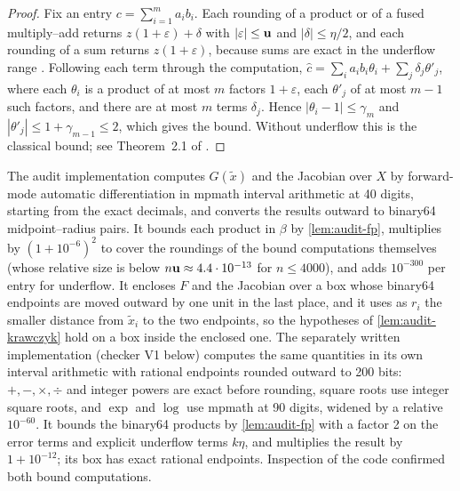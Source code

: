 \begin{proof}
Fix an entry $c=\sum_{i=1}^m a_ib_i$.
Each rounding of a product or of a fused multiply–add returns $z(1+\varepsilon)+\delta$ with $|\varepsilon|\le\mathbf{u}$ and $|\delta|\le\eta/2$, and each rounding of a sum returns $z(1+\varepsilon)$, because sums are exact in the underflow range \citep[Section~2]{rump2010-verification-methods-rigorous-results-using}.
Following each term through the computation, $\hat c=\sum_i a_ib_i\theta_i+\sum_j\delta_j\theta'_j$, where each $\theta_i$ is a product of at most $m$ factors $1+\varepsilon$, each $\theta'_j$ of at most $m-1$ such factors, and there are at most $m$ terms $\delta_j$.
Hence $|\theta_i-1|\le\gamma_m$ and $|\theta'_j|\le1+\gamma_{m-1}\le2$, which gives the bound.
Without underflow this is the classical bound; see Theorem~2.1 of \citet{rump2010-verification-methods-rigorous-results-using}.
\end{proof}

The audit implementation computes $G(\tilde x)$ and the Jacobian over $X$ by forward-mode automatic differentiation in mpmath interval arithmetic at 40 digits, starting from the exact decimals, and converts the results outward to binary64 midpoint–radius pairs.
It bounds each product in $\beta$ by \cref{lem:audit-fp}, multiplies by $(1+10^{-6})^2$ to cover the roundings of the bound computations themselves (whose relative size is below $n\mathbf{u}\approx4.4\cdot10^{-13}$ for $n\le4000$), and adds $10^{-300}$ per entry for underflow.
It encloses $F$ and the Jacobian over a box whose binary64 endpoints are moved outward by one unit in the last place, and it uses as $r_i$ the smaller distance from $\tilde x_i$ to the two endpoints, so the hypotheses of \cref{lem:audit-krawczyk} hold on a box inside the enclosed one.
The separately written implementation (checker V1 below) computes the same quantities in its own interval arithmetic with rational endpoints rounded outward to 200 bits: $+,-,\times,\div$ and integer powers are exact before rounding, square roots use integer square roots, and $\exp$ and $\log$ use mpmath at 90 digits, widened by a relative $10^{-60}$.
It bounds the binary64 products by \cref{lem:audit-fp} with a factor 2 on the error terms and explicit underflow terms $k\eta$, and multiplies the result by $1+10^{-12}$; its box has exact rational endpoints.
Inspection of the code confirmed both bound computations.

